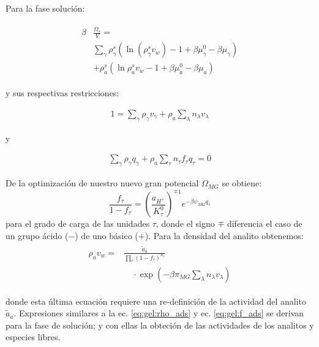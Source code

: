 Para la fase soluci\'on:

\begin{align}
	\begin{aligned}
		\beta&\frac{\Omega_s}{V}=\\& \sum_{\gamma   } {\rho^s_\gamma\left(\ln(\rho_\gamma^sv_w) -1 + \beta\mu_\gamma^0 - \beta\mu_\gamma\right)} \\
		& + \rho^s_a \left( \ln \rho^s_a v_w -1 +\beta\mu^0_a - \beta\mu_a\right)
	\end{aligned}
	\label{eq:gel:bulk-total}
\end{align}

y sus respectivas restricciones:

\begin{align}
	1 = \sum_{\gamma } \rho_\gamma v_\gamma  + \rho_a \sum_\lambda n_\lambda v_\lambda
\end{align}

y 

\begin{align}
	\sum_\gamma \rho_\gamma q_\gamma + \rho_a \sum_\tau n_\tau f_\tau q_\tau = 0
\end{align}



De la optimizaci\'on de nuestro nuevo gran potencial $\Omega_{MG}$  se obtiene:
%
\begin{equation}
\frac{f_\tau}{1-f_\tau}=\left(\frac{a_{H^+}}{K^0_\tau}\right)^{\mp 1} e^{-\beta \psi_{MG} q_\tau}
\label{eq:gel:f_ads}
\end{equation}
%
\noindent para el grado de carga de las unidades $\tau$, donde el signo $\mp$ diferencia el caso de un grupo \'acido ($-$) de uno b\'asico ($+$).
Para la densidad del analito obtenemos:
%
\begin{align}
    \begin{aligned}
   \rho_a v_w =&\frac{ \tilde{a}_a}{\prod_\tau \left(1-f_\tau\right)^{n_\tau}}\\
&\quad \cdot\exp{\left(-\beta \pi_{MG} \sum_\lambda n_\lambda v_\lambda \right)} 
	\label{eq:gel:rho_ads}
    \end{aligned}
\end{align}
%

\noindent donde esta \'ultima ecuaci\'on requiere una re-definici\'on de la actividad del analito $\tilde{a}_a$.
Expresiones similares a la ec. \ref{eq:gel:rho_ads} y ec. \ref{eq:gel:f_ads} se derivan para la fase de soluci\'on; y con ellas la obteci\'on de las actividades  de los analitos y especies libres. 



